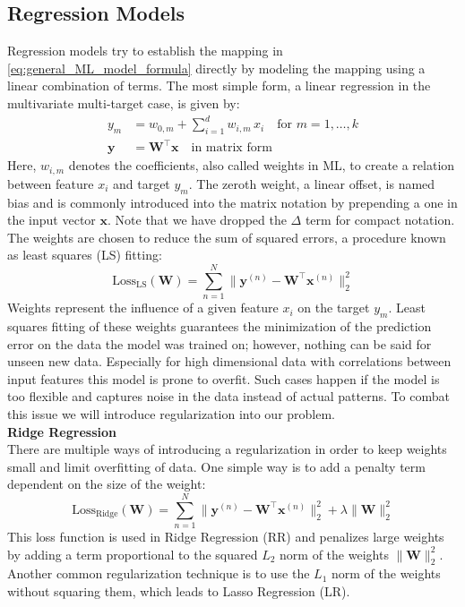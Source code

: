 \subsection{Regression Models}
\label{subsec:background_ml_model_types}
Regression models try to establish the mapping in \autoref{eq:general_ML_model_formula} directly by modeling the mapping using a linear combination of terms. The most simple form, a linear regression in the multivariate multi-target case, is given by: 
\begin{equation}
    \label{eq:linear_regression_formula}
    \begin{aligned}
        y_m &= w_{0, m} + \sum_{i=1}^d w_{i,m} \, x_i \quad \text{for } m = 1, \dots, k\\
        \mathbf{y} &= \mathbf{W^\top} \mathbf{x} \quad \text{in matrix form}
    \end{aligned}
\end{equation}
Here, $w_{i,m}$ denotes the coefficients, also called weights in ML, to create a relation between feature $x_i$ and target $y_m$. The zeroth weight, a linear offset, is named bias and is commonly introduced into the matrix notation by prepending a one in the input vector $\mathbf{x}$. Note that we have dropped the $\Delta$ term for compact notation. The weights are chosen to reduce the sum of squared errors, a procedure known as least squares (LS) fitting: 
\begin{equation}
    \label{eq:least_squares_error}
    \text{Loss}_\text{LS}(\mathbf{W}) = \sum_{n=1}^{N}\|\mathbf{y}^{(n)} - \mathbf{W^\top} \mathbf{x}^{(n)}\|_2^2
\end{equation}
Weights represent the influence of a given feature $x_i$ on the target $y_m$. Least squares fitting of these weights guarantees the minimization of the prediction error on the data the model was trained on; however, nothing can be said for unseen new data. Especially for high dimensional data with correlations between input features this model is prone to overfit. Such cases happen if the model is too flexible and captures noise in the data instead of actual patterns. To combat this issue we will introduce regularization into our problem.\\

\textbf{Ridge Regression}\\
There are multiple ways of introducing a regularization in order to keep weights small and limit overfitting of data. One simple way is to add a penalty term dependent on the size of the weight: 
\begin{equation}
    \label{eq:regularized_least_squares_error}
    \text{Loss}_\text{Ridge}(\mathbf{W}) = \sum_{n=1}^{N}\|\mathbf{y}^{(n)} - \mathbf{W^\top} \mathbf{x}^{(n)}\|_2^2 + \lambda \|\mathbf{W}\|_2^2
\end{equation}
This loss function is used in Ridge Regression (RR) and penalizes large weights by adding a term proportional to the squared $L_2$ norm of the weights $\|\mathbf{W}\|_2^2$. Another common regularization technique is to use the $L_1$ norm of the weights without squaring them, which leads to Lasso Regression (LR). 


